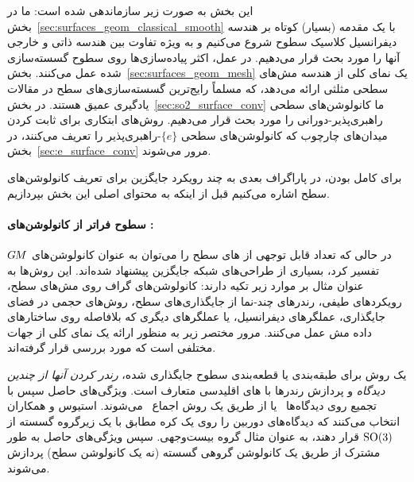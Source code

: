 \etocsettocstyle{}{} %
\localtableofcontents


این بخش به صورت زیر سازماندهی شده است:
ما در بخش~\ref{sec:surfaces_geom_classical_smooth} با یک مقدمه (بسیار) کوتاه بر هندسه دیفرانسیل کلاسیک سطوح شروع می‌کنیم و به ویژه تفاوت بین هندسه ذاتی و خارجی آنها را مورد بحث قرار می‌دهیم.
در عمل، اکثر پیاده‌سازی‌ها روی سطوح گسسته‌سازی شده عمل می‌کنند.
بخش~\ref{sec:surfaces_geom_mesh} یک نمای کلی از هندسه مش‌های سطحی مثلثی ارائه می‌دهد، که مسلماً رایج‌ترین گسسته‌سازی‌های سطح در مقالات یادگیری عمیق هستند.
در بخش~\ref{sec:so2_surface_conv} ما کانولوشن‌های سطحی راهبری‌پذیر-دورانی را مورد بحث قرار می‌دهیم.
روش‌های ابتکاری برای ثابت کردن میدان‌های چارچوب که کانولوشن‌های سطحی $\{e\}$-راهبری‌پذیر را تعریف می‌کنند، در بخش~\ref{sec:e_surface_conv} مرور می‌شوند.


برای کامل بودن، در پاراگراف بعدی به چند رویکرد جایگزین برای تعریف کانولوشن‌های سطح اشاره می‌کنیم
قبل از اینکه به محتوای اصلی این بخش بپردازیم.

\paragraph{ سطوح فراتر از کانولوشن‌های \textit{}:}

در حالی که تعداد قابل توجهی از های سطح را می‌توان به عنوان کانولوشن‌های $G\mkern-1.4muM$ تفسیر کرد، بسیاری از طراحی‌های شبکه جایگزین پیشنهاد شده‌اند.
این روش‌ها به عنوان مثال بر موارد زیر تکیه دارند:
کانولوشن‌های گراف روی مش‌های سطح،
رویکردهای طیفی،
رندرهای چند-نما از جایگذاری‌های سطح،
روش‌های حجمی در فضای جایگذاری،
عملگرهای دیفرانسیل،
یا عملگرهای دیگری که بلافاصله روی ساختارهای داده مش عمل می‌کنند.
مرور مختصر زیر به منظور ارائه یک نمای کلی از جهات مختلفی است که مورد بررسی قرار گرفته‌اند.


یک روش برای طبقه‌بندی یا قطعه‌بندی سطوح جایگذاری شده، \emph{رندر کردن آنها از چندین دیدگاه} و پردازش رندرها با های اقلیدسی متعارف است.
ویژگی‌های حاصل سپس با
تجمیع روی دیدگاه‌ها~\cite{su2015multi,qi2016volumetric}
یا از طریق یک روش اجماع~\cite{paulsen2018multi}  می‌شوند.
استیوس و همکاران\cite{esteves2019multiView} انتخاب می‌کنند که دیدگاه‌های دوربین را روی یک کره مطابق با یک زیرگروه گسسته از $\operatorname{SO}(3)$ قرار دهند، به عنوان مثال گروه بیست‌وجهی.
سپس ویژگی‌های حاصل به طور مشترک از طریق یک کانولوشن گروهی گسسته (نه یک کانولوشن سطح) پردازش می‌شوند.


